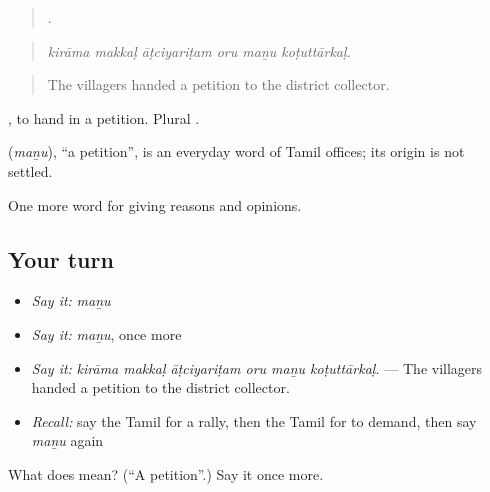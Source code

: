 \begin{quote}
     .
\end{quote}

\begin{quote}
\emph{kirāma makkaḷ āṭciyariṭam oru maṉu koṭuttārkaḷ.}
\end{quote}

\begin{quote}
The villagers handed a petition to the district collector.
\end{quote}

 , to hand in a petition. Plural .

\begin{cousinweb}
\textbf{} (\emph{maṉu}), \textquotedblleft{}a petition\textquotedblright{}, is an everyday word of Tamil offices; its origin is not settled.
\end{cousinweb}

\begin{grammarlens}[title={What you've built}]
One more word for giving reasons and opinions.
\end{grammarlens}

\subsection*{Your turn}
\begin{itemize}
\raggedright
  \item \emph{Say it:} \emph{maṉu}
  \item \emph{Say it:} \emph{maṉu}, once more
  \item \emph{Say it:} \emph{kirāma makkaḷ āṭciyariṭam oru maṉu koṭuttārkaḷ.} — The villagers handed a petition to the district collector.
  \item \emph{Recall:} say the Tamil for a rally, then the Tamil for to demand, then say \emph{maṉu} again
\end{itemize}

\begin{tcolorbox}[breakable,colback=teal!4,colframe=teal!35!black,title={Before you move on}]
What does  mean? (\textquotedblleft{}A petition\textquotedblright{}.) Say it once more.
\end{tcolorbox}
